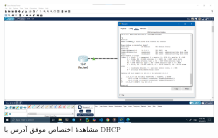 \documentclass[12pt]{article}
\begin{document}
	\begin{figure}[H]
		\centering
		\includegraphics[width=\textwidth]{resources/scenario3-6.png}
		\caption{مشاهدهٔ اختصاص موفق آدرس با \textenglish{DHCP}}
		\label{3:6}
	\end{figure}
	
	\newpage
	\begin{LTR}
		\printbibliography[title={مراجع}]
	\end{LTR}
	
\end{document}
